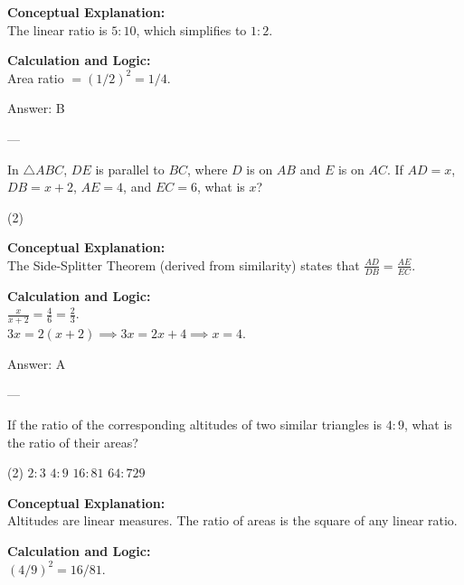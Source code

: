 \documentclass[11pt,paper=a4,answers]{exam}
\begin{document}
\begin{questions}
\begin{solution}
\textbf{Conceptual Explanation:} \\
The linear ratio is $5:10$, which simplifies to $1:2$.

\vspace{10pt}
\textbf{Calculation and Logic:} \\
Area ratio $= (1/2)^2 = 1/4$.

\vspace{15pt}
Answer: \colorbox{yellow!100}{B}
\end{solution}

---

\question
In $\triangle ABC$, $DE$ is parallel to $BC$, where $D$ is on $AB$ and $E$ is on $AC$. If $AD = x$, $DB = x+2$, $AE = 4$, and $EC = 6$, what is $x$?
\begin{tasks}(2)
\end{tasks}

\begin{solution}
\textbf{Conceptual Explanation:} \\
The Side-Splitter Theorem (derived from similarity) states that $\frac{AD}{DB} = \frac{AE}{EC}$.

\vspace{10pt}
\textbf{Calculation and Logic:} \\
$\frac{x}{x+2} = \frac{4}{6} = \frac{2}{3}$. \\
$3x = 2(x+2) \implies 3x = 2x + 4 \implies x = 4$.

\vspace{15pt}
Answer: \colorbox{yellow!100}{A}
\end{solution}

---

\question
If the ratio of the corresponding altitudes of two similar triangles is $4:9$, what is the ratio of their areas?
\begin{tasks}(2)
    \task $2:3$
    \task $4:9$
    \task $16:81$
    \task $64:729$
\end{tasks}

\begin{solution}
\textbf{Conceptual Explanation:} \\
Altitudes are linear measures. The ratio of areas is the square of any linear ratio.

\vspace{10pt}
\textbf{Calculation and Logic:} \\
$(4/9)^2 = 16/81$.


\end{solution}
\end{questions}
\end{document}
